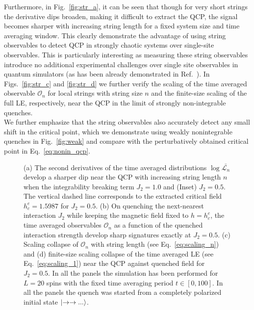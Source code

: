 \documentclass[aps,prx,twocolumn]{revtex4-2}
\begin{document}
{{ {Furthermore, in Fig.~\ref{fig:str_a}, it can be seen that though for very short strings the derivative dips broaden, making it difficult to extract the QCP, the signal becomes sharper with increasing string length for a fixed system size and time averaging window. This clearly demonstrate the advantage of using string observables to detect QCP in strongly chaotic systems over single-site observables. This is particularly interesting as measuring these string observables introduce no additional experimental challenges over single site observables in quantum simulators (as has been already demonstrated in Ref.~\cite{Zhang2017}). In Figs.~\ref{fig:str_c} and \ref{fig:str_d} we further verify the scaling of the time averaged observable $\mathcal{O}_n$ for local strings with string size $n$ and the finite-size scaling of the full LE, respectively, near the QCP in the limit of strongly non-integrable quenches.}\\

 {We further emphasize that the string observables also accurately detect any small shift in the critical point, which we demonstrate using weakly nonintegrable quenches in Fig.~\ref{fig:weak} and compare with the perturbatively obtained critical point in Eq.~\ref{eq:nonin_qcp}. }



\begin{figure*}[ht]
	\hspace{0.5cm}
	
	
	\hspace{0.5cm}
	
	\caption{ {(a) The second derivatives of the time averaged distributions $\log\bar{\mathcal{L}_n}$ develop a sharper dip near the QCP with increasing string length $n$ when the integrability breaking term $J_2=1.0$ and (Inset) $J_2=0.5$. The vertical dashed line corresponds to the extracted critical field $h_c^e=1.5987$ for $J_2=0.5$. (b) On quenching the next-nearest interaction $J_2$ while keeping the magnetic field fixed to $h=h_c^e$, the time averaged observables $\mathcal{O}_n$ as a function of the quenched interaction strength develop sharp signatures exactly at $J_2=0.5$. (c) Scaling collapse of $\mathcal{O}_n$ with string length (see Eq.~\eqref{eq:scaling_n}) and (d)  finite-size scaling collapse of the time averaged LE (see Eq.~\eqref{eq:scaling_1}) near the QCP against quenched field for $J_2=0.5$. In all the panels the simulation has been performed for $L=20$ spins with the fixed time averaging period $t\in[0,100]$. In all the panels the quench was started from a completely polarized initial state $\ket{\rightarrow\rightarrow...}$.}}
\end{figure*}

}}
\end{document}
